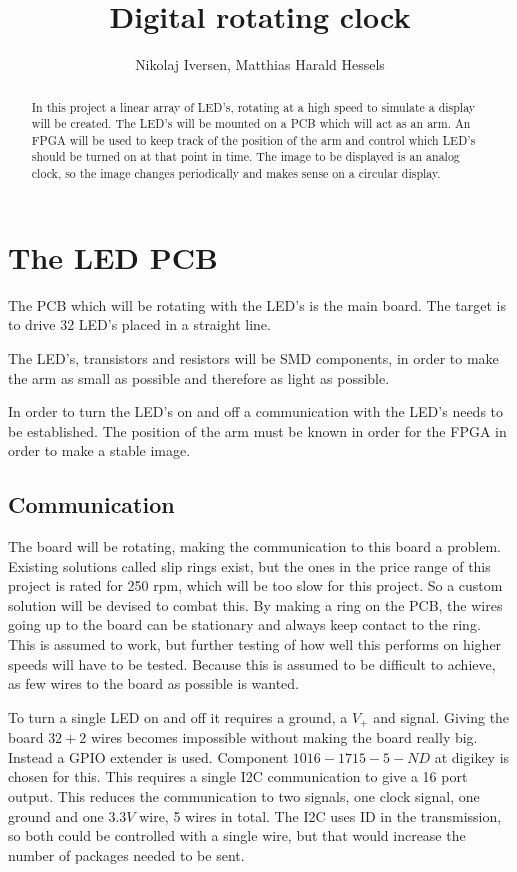 \documentclass[a4paper,12pt,journal]{IEEEtran}
\title{Digital rotating clock}
\author{Nikolaj Iversen, Matthias Harald Hessels}
\begin{document}
\maketitle

\begin{abstract}
In this project a linear array of LED's, rotating at a high speed to simulate a display will be created.
The LED's will be mounted on a PCB which will act as an arm.
An FPGA will be used to keep track of the position of the arm and control which LED's should be turned on at that point in time.
The image to be displayed is an analog clock, so the image changes periodically and makes sense on a circular display.
\end{abstract}

\section{The LED PCB}
The PCB which will be rotating with the LED's is the main board.
The target is to drive 32 LED's placed in a straight line.

The LED's, transistors and resistors will be SMD components, in order to make the arm as small as possible and therefore as light as possible.

In order to turn the LED's on and off a communication with the LED's needs to be established.
The position of the arm must be known in order for the FPGA in order to make a stable image.
\subsection{Communication}
The board will be rotating, making the communication to this board a problem.
Existing solutions called slip rings exist, but the ones in the price range of this project is rated for 250 rpm, which will be too slow for this project.
So a custom solution will be devised to combat this.
By making a ring on the PCB, the wires going up to the board can be stationary and always keep contact to the ring.
This is assumed to work, but further testing of how well this performs on higher speeds will have to be tested.
Because this is assumed to be difficult to achieve, as few wires to the board as possible is wanted.

To turn a single LED on and off it requires a ground, a $V_+$ and signal.
Giving the board $32+2$ wires becomes impossible without making the board really big.
Instead a GPIO extender is used. 
Component $1016-1715-5-ND$ at digikey is chosen for this.
This requires a single I2C communication to give a 16 port output.
This reduces the communication to two signals, one clock signal, one ground and one $3.3V$ wire, 5 wires in total.
The I2C uses ID in the transmission, so both could be controlled with a single wire, but that would increase the number of packages needed to be sent.
\end{document}
